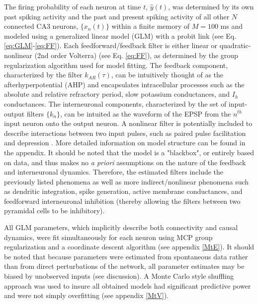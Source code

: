 \documentclass[11pt,a4paper,final]{article}
\begin{document}

The firing probability of each neuron at time $t$, $\hat{y}(t)$, was determined by its own past spiking activity and the past and present spiking activity of all other $N$ connected CA3 neurons, $\{x_n(t)\}$ within a finite memory of $M=100$ ms and modeled using a generalized linear model (GLM) with a probit link (see Eq. \ref{eq:GLM}-\ref{eq:FF}).
Each feedforward/feedback filter is either linear or quadratic-nonlinear (2nd order Volterra)  (see Eq. \ref{eq:FF}), as determined by the group regularization algorithm used for model fitting.
The feedback component, characterized by the filter $k_{AR}(\tau)$, can be intuitively thought of as the afterhyperpotential (AHP) \citep{spruston07} and encapsulates intracellular processes such as the absolute and relative refractory period, slow potassium conductances, and $I_h$ conductances.
The interneuronal components, characterized by the set of input-output filters $\{k_n\}$, can be intuited as the waveform of the EPSP from the $n^{th}$ input neuron onto the output neuron.
A nonlinear filter is potentially included to describe interactions between two input pulses, such as paired pulse facilitation and depression \citep{song09par1,sandler15}.
More detailed information on model structure can be found in the appendix. 
It should be noted that the model is a "blackbox", or entirely based on data, and thus makes no \textit{a priori} assumptions on the nature of the feedback and interneuronal dynamics.
Therefore, the estimated filters include the previously listed phenomena as well as more indirect/nonlinear phenomena such as dendritic integration, spike generation, active membrane conductances, and feedforward interneuronal inhibition (thereby allowing the filters between two pyramidal cells to be inhibitory).

All GLM parameters, which implicitly describe both connectivity and causal dynamics, were fit simultaneously for each neuron using MCP group regularization and a coordinate descent algorithm (see appendix \ref{MtE}).
It should be noted that because parameters were estimated from spontaneous data rather than from direct perturbations of the network, all parameter estimates may be biased by unobserved inputs (see discussion).
A Monte Carlo style shuffling approach was used to insure all obtained models had significant predictive power and were not simply overfitting (see appendix \ref{MtV}).
\end{document}
